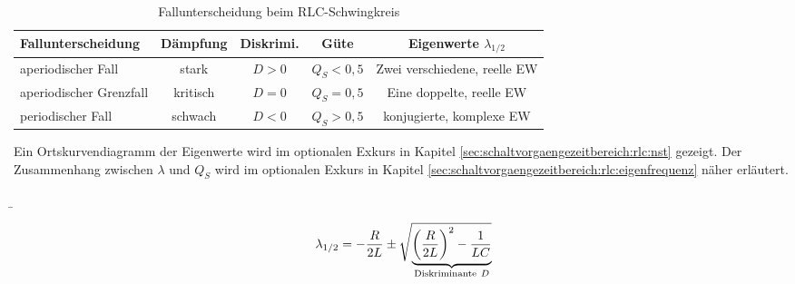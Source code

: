 \begin{frame}[t]
{\begin{table}[H]\centering
    \caption{Fallunterscheidung beim RLC-Schwingkreis}
    \label{tab:rlc:fallunterscheidung}
    \begin{tabular}{lcccc} \toprule
        \textbf{Fallunterscheidung}  & \textbf{Dämpfung} & \textbf{Diskrimi.} & \textbf{Güte} & \textbf{Eigenwerte} $\lambda_{1/2}$ \\ \midrule
        aperiodischer Fall           & stark             & $D > 0$            & $Q_S < 0,5$     & Zwei verschiedene, reelle EW  \\
        aperiodischer Grenzfall      & kritisch          & $D = 0$            & $Q_S = 0,5$     & Eine doppelte, reelle EW \\
        periodischer Fall            & schwach           & $D < 0$            & $Q_S > 0,5$     & konjugierte, komplexe EW \\ \bottomrule
    \end{tabular}
\end{table}

Ein Ortskurvendiagramm der Eigenwerte wird im optionalen Exkurs in Kapitel \ref{sec:schaltvorgaengezeitbereich:rlc:nst} gezeigt.
Der Zusammenhang zwischen $\lambda$ und $Q_S$ wird im optionalen Exkurs in Kapitel \ref{sec:schaltvorgaengezeitbereich:rlc:eigenfrequenz} näher erläutert.

}%
\b{%
\begin{minipage}{\textwidth}\centering
    \begin{minipage}[t][3cm][]{0.48\textwidth}\centering
    \end{minipage}%
    \begin{minipage}[t][3cm][]{0.48\textwidth}\centering
        \begin{align*}
            \lambda_{1/2} = -\frac{R}{2L} \pm \sqrt{
                \smash{\underbrace{%
                \left(\frac{R}{2L}\right)^2 - \frac{1}{LC}
                }_{\mathclap{\text{Diskriminante}\ D}}}
                \vphantom{\left(\frac{R}{2L}\right)^2 - \frac{1}{LC}}%
            }%
        \end{align*}
    \end{minipage}
\end{minipage}\vspace{2pt}

}
\end{frame}
